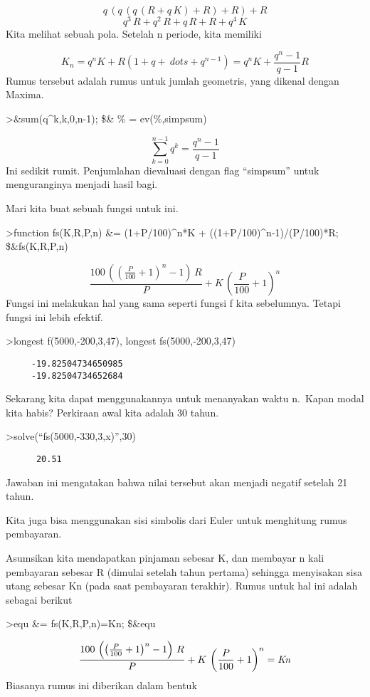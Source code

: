 \documentclass[
]{book}
\begin{document}
\[q\,\left(q\,\left(q\,\left(R+q\,K\right)+R\right)+R\right)+R\]\[q^3\,R+q^2\,R+q\,R+R+q^4\,K\]Kita melihat sebuah pola. Setelah n periode, kita memiliki

\[K_n = q^n K + R (1+q+\ dots+q^{n-1}) = q^n K + \frac{q^n-1}{q-1} R\]Rumus tersebut adalah rumus untuk jumlah geometris, yang dikenal dengan Maxima.

\textgreater\&sum(q\^{}k,k,0,n-1); \$\& \% = ev(\%,simpsum)

\[\sum_{k=0}^{n-1}{q^{k}}=\frac{q^{n}-1}{q-1}\]Ini sedikit rumit. Penjumlahan dievaluasi dengan flag ``simpsum'' untuk menguranginya menjadi hasil bagi.

Mari kita buat sebuah fungsi untuk ini.

\textgreater function fs(K,R,P,n) \&= (1+P/100)\^{}n*K + ((1+P/100)\^{}n-1)/(P/100)*R; \$\&fs(K,R,P,n)

\[\frac{100\,\left(\left(\frac{P}{100}+1\right)^{n}-1\right)\,R}{P}+K
 \,\left(\frac{P}{100}+1\right)^{n}\]Fungsi ini melakukan hal yang sama seperti fungsi f kita sebelumnya. Tetapi fungsi ini lebih efektif.

\textgreater longest f(5000,-200,3,47), longest fs(5000,-200,3,47)

\begin{verbatim}
     -19.82504734650985 
     -19.82504734652684 
\end{verbatim}

Sekarang kita dapat menggunakannya untuk menanyakan waktu n.~Kapan modal kita habis? Perkiraan awal kita adalah 30 tahun.

\textgreater solve(``fs(5000,-330,3,x)'',30)

\begin{verbatim}
      20.51 
\end{verbatim}

Jawaban ini mengatakan bahwa nilai tersebut akan menjadi negatif setelah 21 tahun.

Kita juga bisa menggunakan sisi simbolis dari Euler untuk menghitung rumus pembayaran.

Asumsikan kita mendapatkan pinjaman sebesar K, dan membayar n kali pembayaran sebesar R (dimulai setelah tahun pertama) sehingga menyisakan sisa utang sebesar Kn (pada saat pembayaran terakhir). Rumus untuk hal ini adalah sebagai berikut

\textgreater equ \&= fs(K,R,P,n)=Kn; \$\&equ

\[\frac{100\,\left(\left(\frac{P}{100}+1\right)^{n}-1\right)\,R}{P}+K
 \,\left(\frac{P}{100}+1\right)^{n}={\it Kn}\]Biasanya rumus ini diberikan dalam bentuk
\end{document}
